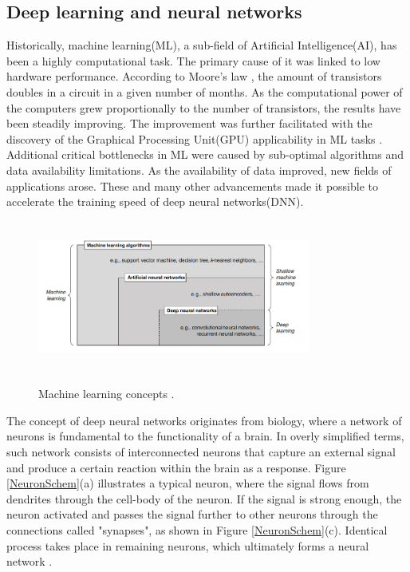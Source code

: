 \documentclass[english, 12pt, a4paper, elec, utf8, a-1b, online]{aaltothesis}
\begin{document}
\subsection{Deep learning and neural networks}
Historically, machine learning(ML), a sub-field of Artificial Intelligence(AI), has been a highly computational task. The primary cause of it was linked to low hardware performance. According to Moore's law \cite{Etiemble2022}, the amount of transistors doubles in a circuit in a given number of months.  As the computational power of the computers grew proportionally to the number of transistors, the results have been steadily improving. The improvement was further facilitated with the discovery of the Graphical Processing Unit(GPU) applicability in ML tasks \cite{Hwang2018}. Additional critical bottlenecks in ML were caused by sub-optimal algorithms and data availability limitations. As the availability of data improved, new fields of applications arose. These and many other advancements made it possible to accelerate the training speed of deep neural networks(DNN).  

\begin{figure}[htb]
	\begin{center}
		\includegraphics[width=0.8\textwidth,height=50mm]{./ml1.png}
	\end{center}
	\caption{Machine learning concepts \cite{Janiesch2021}.}
	\begin{center}
		\label{MLConcepts}
	\end{center}
\end{figure}
\FloatBarrier

The concept of deep neural networks originates from biology, where a network of neurons is fundamental to the functionality of a brain. In overly simplified terms, such network consists of interconnected neurons that capture an external signal and produce a certain reaction within the brain as a response. Figure \ref{NeuronSchem}(a) illustrates a typical neuron, where the signal flows from dendrites through the cell-body of the neuron. If the signal is strong enough, the neuron activated and passes the signal further to other neurons through the connections called "synapses", as shown in Figure \ref{NeuronSchem}(c). Identical process takes place in remaining neurons, which ultimately forms a neural network \cite{Mehlig_2021}.
\end{document}
